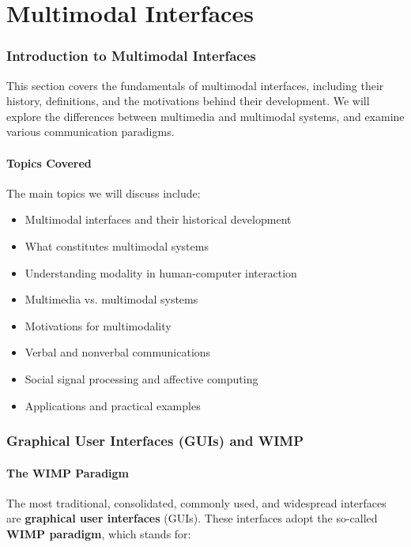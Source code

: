 \documentclass[11pt,a4paper]{article}
\theoremstyle{definition}
\theoremstyle{plain}
\theoremstyle{remark}
\begin{document}
\newpage
\tableofcontents
\newpage



\part{Multimodal Interfaces}

\section{Introduction to Multimodal Interfaces}

This section covers the fundamentals of multimodal interfaces, including their history, definitions, and the motivations behind their development. We will explore the differences between multimedia and multimodal systems, and examine various communication paradigms.

\subsection{Topics Covered}

The main topics we will discuss include:
\begin{itemize}
    \item Multimodal interfaces and their historical development
    \item What constitutes multimodal systems
    \item Understanding modality in human-computer interaction
    \item Multimedia vs. multimodal systems
    \item Motivations for multimodality
    \item Verbal and nonverbal communications
    \item Social signal processing and affective computing
    \item Applications and practical examples
\end{itemize}

\section{Graphical User Interfaces (GUIs) and WIMP}

\subsection{The WIMP Paradigm}

The most traditional, consolidated, commonly used, and widespread interfaces are \textbf{graphical user interfaces} (GUIs). These interfaces adopt the so-called \textbf{WIMP paradigm}, which stands for:
\end{document}
